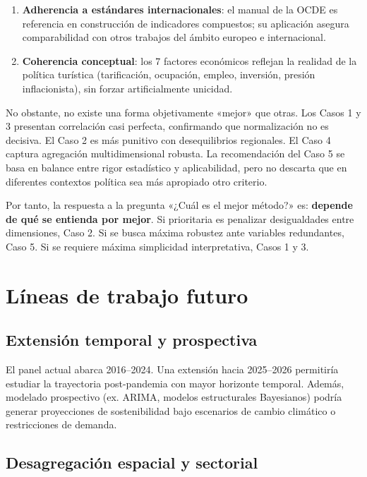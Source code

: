 {\begin{enumerate}
    \item \textbf{Adherencia a estándares internacionales}: el manual de la OCDE es referencia en construcción de indicadores compuestos; su aplicación asegura comparabilidad con otros trabajos del ámbito europeo e internacional.
    
    \item \textbf{Coherencia conceptual}: los 7 factores económicos reflejan la realidad de la política turística (tarificación, ocupación, empleo, inversión, presión inflacionista), sin forzar artificialmente unicidad.
\end{enumerate}

No obstante, no existe una forma objetivamente «mejor» que otras. Los Casos 1 y 3 presentan correlación casi perfecta, confirmando que normalización no es decisiva. El Caso 2 es más punitivo con desequilibrios regionales. El Caso 4 captura agregación multidimensional robusta. La recomendación del Caso 5 se basa en balance entre rigor estadístico y aplicabilidad, pero no descarta que en diferentes contextos política sea más apropiado otro criterio.

Por tanto, la respuesta a la pregunta «¿Cuál es el mejor método?» es: \textbf{depende de qué se entienda por mejor}. Si prioritaria es penalizar desigualdades entre dimensiones, Caso 2. Si se busca máxima robustez ante variables redundantes, Caso 5. Si se requiere máxima simplicidad interpretativa, Casos 1 y 3.

\section{Líneas de trabajo futuro}

\subsection{Extensión temporal y prospectiva}

El panel actual abarca 2016--2024. Una extensión hacia 2025--2026 permitiría estudiar la trayectoria post-pandemia con mayor horizonte temporal. Además, modelado prospectivo (ex. ARIMA, modelos estructurales Bayesianos) podría generar proyecciones de sostenibilidad bajo escenarios de cambio climático o restricciones de demanda.

\subsection{Desagregación espacial y sectorial}

}
